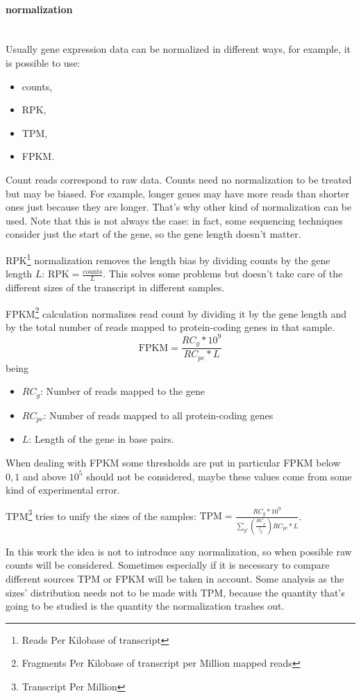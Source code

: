 \paragraph{normalization}\mbox{}\\
Usually gene expression data can be normalized in different ways, for example, it is possible to use:
\begin{itemize}
	\item counts,
	\item RPK,
	\item TPM,
	\item FPKM.
\end{itemize}
Count reads correspond to raw data. Counts need no normalization to be treated but may be biased. For example, longer genes may have more reads than shorter ones just because they are longer. That's why other kind of normalization can be used. Note that this is not always the case: in fact, some sequencing techniques consider just the start of the gene, so the gene length doesn't matter.   

RPK\footnote{Reads Per Kilobase of transcript} normalization removes the length bias by dividing counts by the gene length $L$: \(\text{RPK}=\frac{\text{counts}}{L}\). This solves some problems but doesn't take care of the different sizes of the transcript in different samples.

FPKM\footnote{Fragments Per Kilobase of transcript per Million mapped reads} calculation normalizes read count by dividing it by the gene length and by the total number of reads mapped to protein-coding genes in that sample.
\[
\text{FPKM} = \frac{RC_g*10^9}{RC_{pc}*L}
\]
being
\begin{itemize}
	\item $RC_g$: Number of reads mapped to the gene
	\item $RC_{pc}$: Number of reads mapped to all protein-coding genes
	\item $L$: Length of the gene in base pairs.
\end{itemize}
When dealing with FPKM some thresholds are put in particular FPKM below $0,1$ and above $10^5$ should not be considered, maybe these values come from some kind of experimental error.

TPM\footnote{Transcript Per Million} tries to unify the sizes of the samples: $\text{TPM} = \frac{RC_g*10^9}{\sum_{g\prime} \left(\frac{RC_{g^\prime}}{l_{g^\prime}}\right) RC_{pc}*L}$.

In this work the idea is not to introduce any normalization, so when possible raw counts will be considered. Sometimes especially if it is necessary to compare different sources TPM or FPKM will be taken in account. Some analysis as the sizes' distribution needs not to be made with TPM, because the quantity that's going to be studied is the quantity the normalization trashes out.

